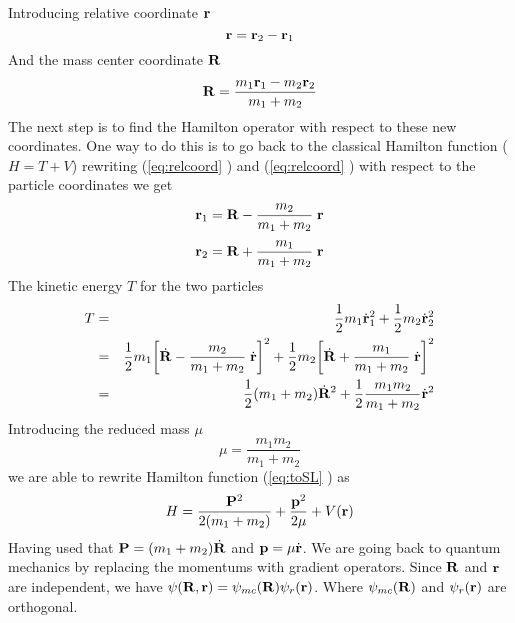 Introducing relative coordinate ${\bf r}$
%
\begin{equation}\label{eq:relcoord}
{\bf r}={\bf r}_2-{\bf r}_1
\end{equation}
%
And the mass center coordinate ${\bf R}$
%
\begin{equation}\label{eq:mascoord}
{\bf R}=\frac{m_1{\bf r}_1-m_2{\bf r}_2}{m_1+m_2}
\end{equation}
%
The next step is to find the Hamilton operator with respect to these new coordinates. 
One way to do this is to go back to the
classical Hamilton function ($H=T+V$) %
rewriting (\ref{eq:relcoord} ) and (\ref{eq:relcoord} ) with respect to the particle coordinates we get
%
\begin{equation}\label{eq:r1}
{\bf r}_1={\bf R} -\frac{m_2}{m_1+m_2}\;{\bf r}
\end{equation}
\begin{equation}\label{eq:r2}
{\bf r}_2={\bf R} +\frac{m_1}{m_1+m_2}\;{\bf r}
\end{equation}
%
The kinetic energy $T$ for the two particles
%
\begin{eqnarray}\label{eq:kinetiskt}
T
&=&
\inv{2}m_1{\dot{{\bf r}}_1}^2+\inv{2}m_2{\dot{{\bf r}}_2}^2\nonumber\\
&=&
\inv{2}m_1\bigg[ \dot{{\bf R}} -\frac{m_2}{m_1+m_2}\;\dot{{\bf r}} \bigg]^2
+\inv{2}m_2 \bigg[\dot{{\bf R}} +\frac{m_1}{m_1+m_2}\;\dot{{\bf r}}\bigg]^2\nonumber\\
&=&
\inv{2}(m_1+m_2)\dot{{\bf R}}^2+\inv{2}\frac{m_1m_2}{m_1+m_2}\dot{{\bf r}}^2
\end{eqnarray}
%
Introducing the reduced mass $\mu$
%
\begin{equation}\label{eq:mu}
{\mu}=\frac{m_1m_2}{m_1+m_2}
\end{equation}
%
we are able to rewrite Hamilton function (\ref{eq:toSL} ) as
%
\begin{equation}
H=\frac{{\bf P}^2}{2(m_1+m_2)}+\frac{{\bf p}^2}{2\mu}+V({\bf r})
\end{equation}
%
%
%
Having used that ${\bf P}= (m_1+m_2)\dot{{\bf R}}$ and ${\bf p}=\mu\dot{{\bf r}}$. We are going back to quantum mechanics
by replacing the momentums with gradient operators. Since ${\bf R}$ and ${\bf r}$ are
independent, we have $\psi({\bf R},{\bf r})=\psi_{mc}({\bf R})\psi_{r}({\bf r})$.
Where $\psi_{mc}({\bf R})$ and $\psi_r({\bf r})$ are orthogonal.
